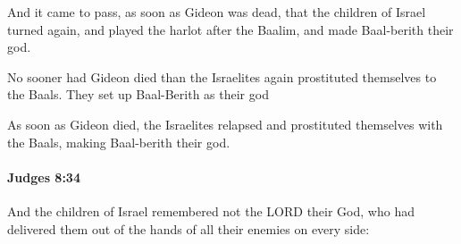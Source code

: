 			\begin{versebox}
					\item[BHS] 
					\item[ASV] And it came to pass, as soon as Gideon was dead, that the children of Israel turned again, and played the harlot after the Baalim, and made Baal-berith their god.
					\item[NIV] No sooner had Gideon died than the Israelites again prostituted themselves to the Baals. They set up Baal-Berith as their god
					\item[NRSV] As soon as Gideon died, the Israelites relapsed and prostituted themselves with the Baals, making Baal-berith their god.
			\end{versebox}

		\paragraph{Judges 8:34} %
			\label{JUDGES-8-34}

			And the children of Israel remembered not the LORD their God, who had delivered them out of the hands of all their enemies on every side:

